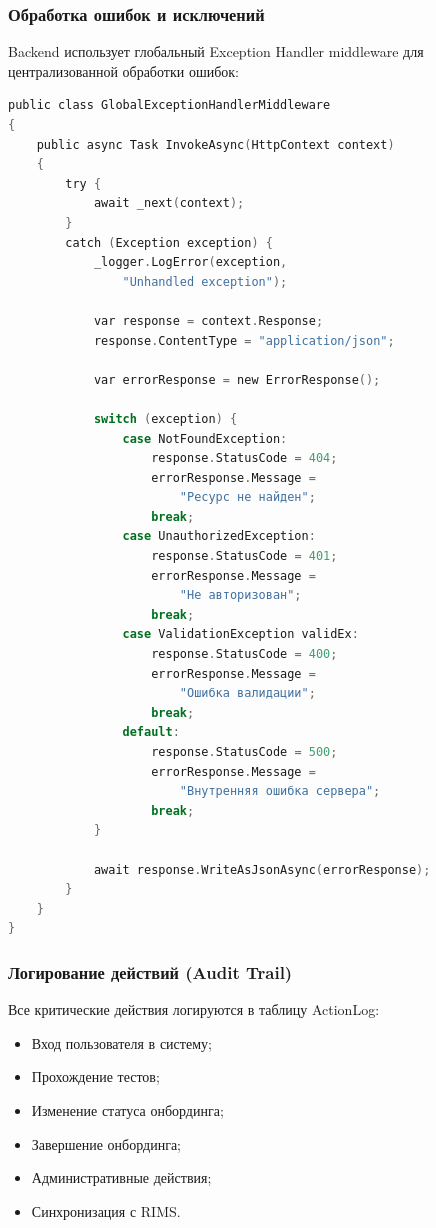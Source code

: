 \subsubsection{Обработка ошибок и исключений}

Backend использует глобальный Exception Handler middleware для централизованной обработки ошибок:

\begin{lstlisting}[language=C, basicstyle=\ttfamily\small]
public class GlobalExceptionHandlerMiddleware
{
    public async Task InvokeAsync(HttpContext context)
    {
        try {
            await _next(context);
        }
        catch (Exception exception) {
            _logger.LogError(exception, 
                "Unhandled exception");
            
            var response = context.Response;
            response.ContentType = "application/json";
            
            var errorResponse = new ErrorResponse();
            
            switch (exception) {
                case NotFoundException:
                    response.StatusCode = 404;
                    errorResponse.Message = 
                        "Ресурс не найден";
                    break;
                case UnauthorizedException:
                    response.StatusCode = 401;
                    errorResponse.Message = 
                        "Не авторизован";
                    break;
                case ValidationException validEx:
                    response.StatusCode = 400;
                    errorResponse.Message = 
                        "Ошибка валидации";
                    break;
                default:
                    response.StatusCode = 500;
                    errorResponse.Message = 
                        "Внутренняя ошибка сервера";
                    break;
            }
            
            await response.WriteAsJsonAsync(errorResponse);
        }
    }
}
\end{lstlisting}

\subsubsection{Логирование действий (Audit Trail)}

Все критические действия логируются в таблицу ActionLog:

\begin{itemize}
    \item Вход пользователя в систему;
    \item Прохождение тестов;
    \item Изменение статуса онбординга;
    \item Завершение онбординга;
    \item Административные действия;
    \item Синхронизация с RIMS.
\end{itemize}

